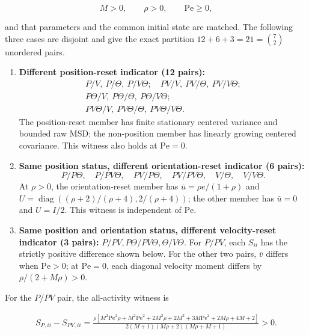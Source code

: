 \[
M>0,\qquad \rho>0,\qquad \mathrm{Pe}\ge0,
\]

and that parameters and the common initial state are matched. The following three cases are disjoint and give the exact partition \(12 + 6 + 3 = 21=\binom72\) unordered pairs.

\begin{enumerate}
\item \textbf{Different position-reset indicator (12 pairs):}
\[
\begin{gathered}
P/V,\ P/\Theta,\ P/V\Theta;\quad PV/V,\ PV/\Theta,\ PV/V\Theta;\\
P\Theta/V,\ P\Theta/\Theta,\ P\Theta/V\Theta;\\
PV\Theta/V,\ PV\Theta/\Theta,\ PV\Theta/V\Theta.
\end{gathered}
\]
The position-reset member has finite stationary centered variance and bounded raw MSD; the non-position member has linearly growing centered covariance. This witness also holds at \(\mathrm{Pe}=0\).

\item \textbf{Same position status, different orientation-reset indicator (6 pairs):}
\[
P/P\Theta,\quad P/PV\Theta,\quad PV/P\Theta,\quad PV/PV\Theta,\quad V/\Theta,\quad V/V\Theta.
\]
At \(\rho>0\), the orientation-reset member has \(\bar u=\rho e/(1+\rho)\) and \(U=\operatorname{diag}((\rho+2)/(\rho+4),2/(\rho+4))\); the other member has \(\bar u=0\) and \(U=I/2\). This witness is independent of \(\mathrm{Pe}\).

\item \textbf{Same position and orientation status, different velocity-reset indicator (3 pairs):}
\(P/PV, P\Theta/PV\Theta, \Theta/V\Theta\).
For \(P/PV\), each \(S_{ii}\) has the strictly positive difference shown below. For the other two pairs, \(\bar v\) differs when \(\mathrm{Pe}>0\); at \(\mathrm{Pe}=0\), each diagonal velocity moment differs by \(\rho/(2+M\rho)>0\).
\end{enumerate}

For the \(P/PV\) pair, the all-activity witness is

\[
\begin{aligned}
S_{P,ii}-S_{PV,ii}
=
\frac{\rho\left[
M^2\mathrm{Pe}^2\rho+M^2\mathrm{Pe}^2+2M^2\rho+2M^2
+3M\mathrm{Pe}^2+2M\rho+4M+2\right]}
{2(M+1)(M\rho+2)(M\rho+M+1)}
>0 .
\end{aligned}
\]

